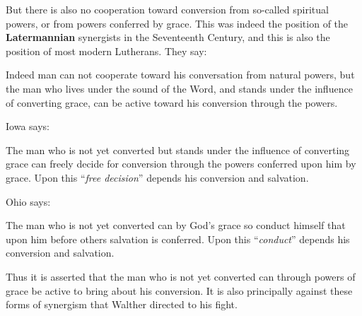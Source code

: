      But there is also no cooperation toward conversion from so-called spiritual powers, or from powers conferred by grace.  This was indeed the position of the \textbf{Latermannian} synergists in the Seventeenth Century, and this is also the position of most modern Lutherans.  They say:  \begin{displayquote}{\footnotesize Indeed man can not cooperate toward his conversation from natural powers, but the man who lives under the sound of the Word, and stands under the influence of converting grace, can be active toward his conversion through the powers.}\end{displayquote} Iowa says: \begin{displayquote}{\footnotesize The man who is not yet converted but stands under the influence of converting grace can freely decide for conversion through the powers conferred upon him by grace.  Upon this “\textit{free decision}” depends his conversion and salvation.}\end{displayquote} Ohio says:  \begin{displayquote}{\footnotesize The man who is not yet converted can by God’s grace so conduct himself that upon him before others salvation is conferred.  Upon this “\textit{conduct}” depends his conversion and salvation.}\end{displayquote}  Thus it is asserted that the man who is not yet converted can through powers of grace be active to bring about his conversion.  It is also principally against these forms of synergism that Walther directed to his fight.

